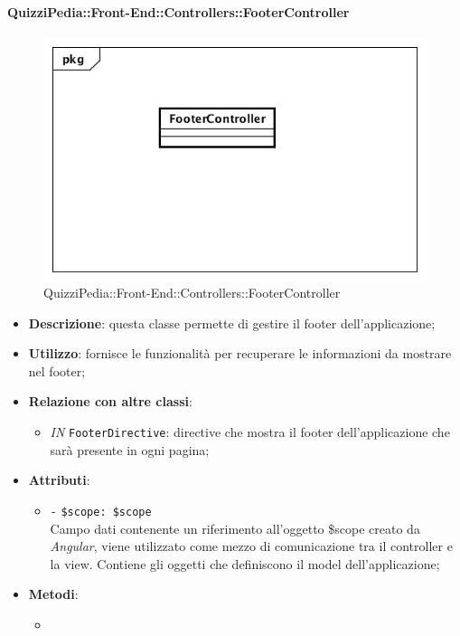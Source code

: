 \paragraph{QuizziPedia::Front-End::Controllers::FooterController}
\begin{figure} [ht]
	\centering
	\includegraphics[scale=0.45]{UML/Classi/Front-End/QuizziPedia_Front-end_Controller_FooterController.png}
	\caption{QuizziPedia::Front-End::Controllers::FooterController}
\end{figure} \FloatBarrier
\begin{itemize}
	\item \textbf{Descrizione}: questa classe permette di gestire il footer dell'applicazione;
	\item \textbf{Utilizzo}: fornisce le funzionalità per recuperare le informazioni da mostrare nel footer;
	\item \textbf{Relazione con altre classi}:
	\begin{itemize}
		\item \textit{IN} \texttt{FooterDirective}: directive che mostra il footer dell'applicazione che sarà presente in ogni pagina;  
	\end{itemize}
	\item \textbf{Attributi}:
	\begin{itemize}
		\item \texttt{-} \texttt{\$scope: \$scope} \\
		Campo dati contenente un riferimento all’oggetto \$scope creato da \textit{Angular}, viene utilizzato come mezzo di comunicazione tra il controller e la view. Contiene gli oggetti che definiscono il model dell’applicazione;
	\end{itemize}
	\item \textbf{Metodi}:
	\begin{itemize}
		\item 
	\end{itemize}
\end{itemize}

